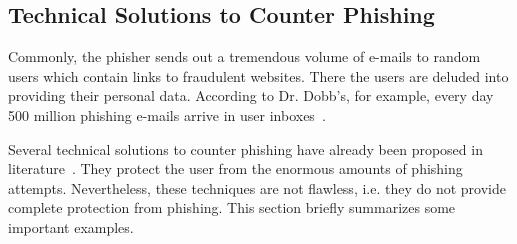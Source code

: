 \subsection{Technical Solutions to Counter Phishing}
\label{s:technical_solutions}
Commonly, the phisher sends out a tremendous volume of e-mails to random users which contain links to fraudulent websites.
 There the users are deluded into providing their personal data.
According to Dr. Dobb's, for example, every day 500 million phishing e-mails arrive in user inboxes~\cite{drdobb2012email}.


Several technical solutions to counter phishing have already been proposed in literature~\cite{purkait2012phishing}. 
They protect the user from the enormous amounts of phishing attempts. Nevertheless, these techniques are not flawless, i.e. they do not provide complete protection from phishing. 
This section briefly summarizes some important examples.

